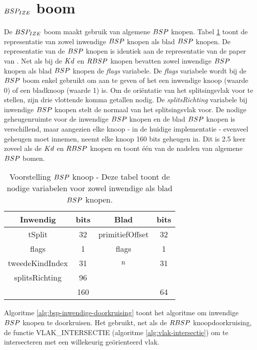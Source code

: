 \section{$BSP_{IZE}$ boom}
\label{sec:h4-bspize}
De $BSP_{IZE}$ boom maakt gebruik van algemene $\symBSP$ knopen. 
Tabel \ref{tab:voorstelling-bsp-knoop} toont de representatie van zowel inwendige $\symBSP$ knopen als blad $\symBSP$ knopen.
De representatie van de $\symBSP$ knopen is identiek aan de representatie van de paper van \authorIze{} \cite{ize}.
Net als bij de $Kd$ en $RBSP$ knopen bevatten zowel inwendige $\symBSP$ knopen als blad $\symBSP$ knopen de \textit{flags} variabele.
De \textit{flags} variabele wordt bij de $\symBSP$ boom enkel gebruikt om aan te geven of het een inwendige knoop (waarde 0) of een bladknoop (waarde 1) is.
Om de oriëntatie van het splitsingsvlak voor te stellen, zijn drie vlottende komma getallen nodig.
De \textit{splitsRichting} variabele bij inwendige $\symBSP$ knopen stelt de normaal van het splitsingsvlak voor.
De nodige geheugenruimte voor de inwendige $\symBSP$ knopen en de blad $\symBSP$ knopen is verschillend, maar aangezien elke knoop - in de huidige implementatie - evenveel geheugen moet innemen, neemt elke knoop 160 bits geheugen in.
Dit is 2.5 keer zoveel als de $Kd$ en $RBSP$ knopen en toont één van de nadelen van algemene $\symBSP$ bomen.\\
\begin{table}
        \centering
        \begin{tabular}{@{}|c|c|c|c|@{}} \toprule      
            Inwendig & bits & Blad & bits \\ \midrule
            tSplit & 32 & primitiefOffset & 32 \\
            flags  & 1  &  flags   & 1    \\
            tweedeKindIndex & 31 & $n$ & 31 \\
            splitsRichting & 96 &  &  \\ \hline \hline
            & 160 & & 64    \\ \bottomrule
        \end{tabular}
    \caption[Voorstelling $\symBSP$ knoop]{Voorstelling $\symBSP$ knoop - \small Deze tabel toont de nodige variabelen voor zowel inwendige als blad $\symBSP$ knopen.}
    \label{tab:voorstelling-bsp-knoop}
\end{table}   

Algoritme \ref{alg:bsp-inwendige-doorkruising} toont het algoritme om inwendige $\symBSP$ knopen te doorkruisen.
Het gebruikt, net als de $RBSP$ knoopdoorkruising, de functie VLAK\_INTERSECTIE (algoritme \ref{alg:vlak-intersectie}) om te intersecteren met een willekeurig geörienteerd vlak.
  

